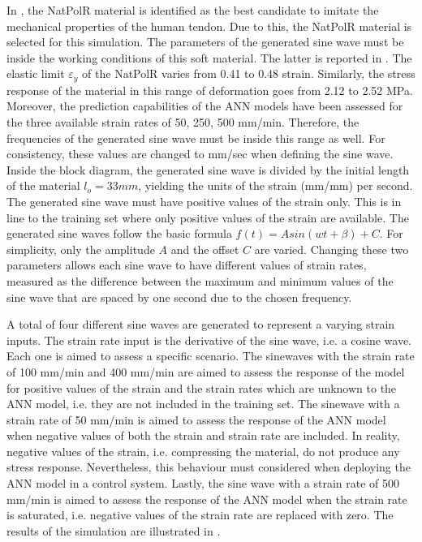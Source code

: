 In , the NatPolR material is identified as the best candidate to imitate the mechanical properties of the human tendon. Due to this, the NatPolR material is selected for this simulation. The parameters of the generated sine wave must be inside the working conditions of this soft material. The latter is reported in . The elastic limit $\varepsilon_y$ of the NatPolR varies from  0.41 to 0.48 strain. Similarly, the stress response of the material in this range of deformation goes from 2.12 to 2.52 MPa. Moreover, the prediction capabilities of the ANN models have been assessed for the three available strain rates of 50, 250, 500 mm/min. Therefore, the frequencies of the generated sine wave must be inside this range as well. For consistency, these values are changed to mm/sec when defining the sine wave. Inside the block diagram, the generated sine wave is divided by the initial length of the material $l_o = 33 mm$, yielding the units of the strain (mm/mm) per second. The generated sine wave must have positive values of the strain only. This is in line to the training set where only positive values of the strain are available. The generated sine waves follow the basic formula $f(t) = A sin(wt+\beta) + C$. For simplicity, only the amplitude $A$ and the offset $C$ are varied. Changing these two parameters allows each sine wave to have different values of strain rates, measured as the difference between the maximum and minimum values of the sine wave that are spaced by one second due to the chosen frequency.

A total of four different sine waves are generated to represent a varying strain inputs. The strain rate input is the derivative of the sine wave, i.e. a cosine wave. Each one is aimed to assess a specific scenario. The sinewaves with the strain rate of 100 mm/min and 400 mm/min are aimed to assess the response of the model for positive values of the strain and the strain rates which are unknown to the ANN model, i.e. they are not included in the training set. The sinewave with a strain rate of 50 mm/min is aimed to assess the response of the ANN model when negative values of both the strain and strain rate are included. In reality, negative values of the strain, i.e. compressing the material, do not produce any stress response. Nevertheless, this behaviour must considered when deploying the ANN model in a control system. Lastly, the sine wave with a strain rate of 500 mm/min is aimed to assess the response of the ANN model when the strain rate is saturated, i.e. negative values of the strain rate are replaced with zero. The results of the simulation are illustrated in .

